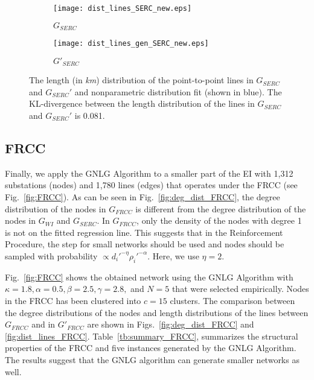 \documentclass[10pt,journal]{IEEEtran}
\begin{document}
\begin{figure}[t]
\centering
\begin{subfigure}[b]{0.23\textwidth}
\vspace*{-0.2cm}
\texttt{[image: dist\_lines\_SERC\_new.eps]}
\caption{$G_{SERC}$}
\vspace*{0.2cm}
\end{subfigure}
\begin{subfigure}[b]{0.23\textwidth}
\vspace*{-0.2cm}
\texttt{[image: dist\_lines\_gen\_SERC\_new.eps]}
\caption{$G'_{SERC}$}
\vspace*{0.2cm}
\end{subfigure}
\vspace{-0.2cm}
\caption{The  length (in \emph{km}) distribution of the point-to-point lines in  $G_{SERC}$ and $G_{SERC}'$ and nonparametric distribution fit (shown in blue). The KL-divergence between the length distribution of the lines in $G_{SERC}$ and $G_{SERC}'$ is 0.081.}
\label{fig:dist_lines_SERC}
\end{figure}

\subsection{FRCC}\label{subsec:FRCC}
Finally, we apply the GNLG Algorithm to a smaller part of the EI with  1,312 substations (nodes) and 1,780 lines (edges) that operates under the FRCC (see Fig.~\ref{fig:FRCC}).  As can be seen in Fig.~\ref{fig:deg_dist_FRCC}, the degree distribution of the nodes in $G_{FRCC}$ is different from the degree distribution of the nodes in $G_{WI}$ and $G_{SERC}$. In $G_{FRCC}$, only the density of the nodes with degree 1 is not on the fitted regression line. This suggests that in the Reinforcement Procedure, the step for small networks should be used and nodes should be sampled with probability $\propto d_i'^{-\eta}\rho_i'^{-\alpha}$. Here, we use $\eta=2$.


Fig.~\ref{fig:FRCC} shows the obtained network using the GNLG Algorithm with $\kappa=1.8, \alpha = 0.5, \beta = 2.5, \gamma = 2.8,$ and $N=5$ that were selected empirically. Nodes in the FRCC has been clustered into $c=15$ clusters. The comparison between the degree distributions of the nodes and length distributions of the lines between $G_{FRCC}$ and in $G'_{FRCC}$ are shown in Figs.~\ref{fig:deg_dist_FRCC} and \ref{fig:dist_lines_FRCC}. Table~\ref{tb:summary_FRCC}, summarizes the structural properties of the FRCC and five instances generated by the GNLG Algorithm. The results suggest that the GNLG algorithm can generate smaller networks as well.
\end{document}
